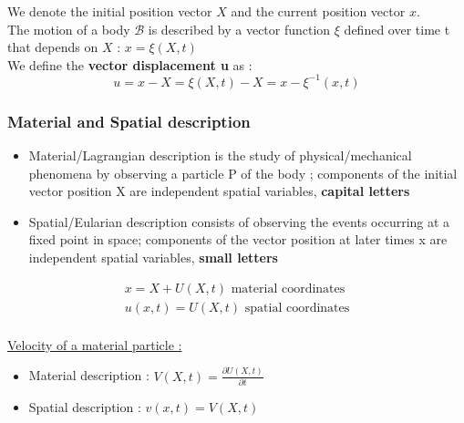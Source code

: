 \documentclass[../main.tex]{subfiles}
\begin{document}
We denote the initial position vector $X$ and the current position vector $x$.\\

The motion of a body $\mathcal{B}$ is described by a vector function $\xi$ defined over time t that depends on $X$ : $x=\xi(X,t)$\\

We define the \textbf{vector displacement u} as : \begin{equation}
    u = x-X = \xi(X,t) - X = x-\xi^{-1} (x,t)
\end{equation}

\subsubsection{Material and Spatial description}
\begin{itemize}
    \item Material/Lagrangian description is the study of physical/mechanical phenomena by observing a particle P of the body ; components of the initial vector position X are independent spatial variables, \textbf{capital letters}\\
    \item Spatial/Eularian description consists of observing the events occurring at a fixed point in space; components of the vector position at later times x are independent spatial variables, \textbf{small letters}\\
\end{itemize}

\begin{equation}
    \begin{gathered}
        x = X+U(X,t) \text{ material coordinates}\\
        u(x,t) = U(X,t) \text{ spatial coordinates}\\
    \end{gathered}
\end{equation}

\quad \underline{Velocity of a material particle :}\\

\begin{itemize}
    \item Material description : $V(X,t) = \frac{\partial U(X,t)}{\partial t}$\\
    \item Spatial description : $v(x,t) = V(X,t)$\\
\end{itemize}
\end{document}
